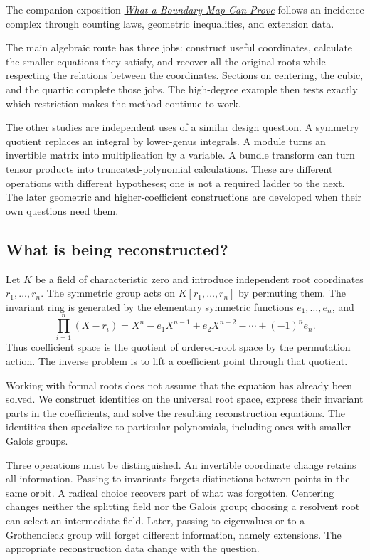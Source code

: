 \documentclass[11pt]{article}
\theoremstyle{remark}
\begin{document}
The companion exposition \href{https://refactor.press/notes/what-a-boundary-map-can-prove}{\emph{What a Boundary Map Can Prove}} follows an incidence complex through counting laws, geometric inequalities, and extension data.

The main algebraic route has three jobs: construct useful coordinates, calculate the smaller equations they satisfy, and recover all the original roots while respecting the relations between the coordinates. Sections on centering, the cubic, and the quartic complete those jobs. The high-degree example then tests exactly which restriction makes the method continue to work.

The other studies are independent uses of a similar design question. A symmetry quotient replaces an integral by lower-genus integrals. A module turns an invertible matrix into multiplication by a variable. A bundle transform can turn tensor products into truncated-polynomial calculations. These are different operations with different hypotheses; one is not a required ladder to the next. The later geometric and higher-coefficient constructions are developed when their own questions need them.

\subsection{What is being reconstructed?}

Let \(K\) be a field of characteristic zero and introduce independent root coordinates \(r_1,\ldots,r_n\). The symmetric group acts on \(K[r_1,\ldots,r_n]\) by permuting them. The invariant ring is generated by the elementary symmetric functions \(e_1,\ldots,e_n\), and
\[
\prod_{i=1}^n(X-r_i)
=X^n-e_1X^{n-1}+e_2X^{n-2}-\cdots+(-1)^ne_n.
\]
Thus coefficient space is the quotient of ordered-root space by the permutation action. The inverse problem is to lift a coefficient point through that quotient.

Working with formal roots does not assume that the equation has already been solved. We construct identities on the universal root space, express their invariant parts in the coefficients, and solve the resulting reconstruction equations. The identities then specialize to particular polynomials, including ones with smaller Galois groups.

Three operations must be distinguished. An invertible coordinate change retains all information. Passing to invariants forgets distinctions between points in the same orbit. A radical choice recovers part of what was forgotten. Centering changes neither the splitting field nor the Galois group; choosing a resolvent root can select an intermediate field. Later, passing to eigenvalues or to a Grothendieck group will forget different information, namely extensions. The appropriate reconstruction data change with the question.
\end{document}
